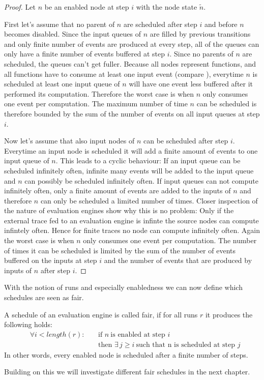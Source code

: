 \begin{proof}
  Let \(n\) be an enabled node at step \(i\) with the node state \(\widetilde{n}\).

  First let's assume that no parent of \(n\) are scheduled after step \(i\) and before \(n\) becomes disabled.
  Since the input queues of \(n\) are filled by previous transitions and only finite number of events are produced at every step, all of the queues can only have a finite number of events buffered at step \(i\).
  Since no parents of \(n\) are scheduled, the queues can't get fuller.
  Because all nodes represent functions, and all functions have to consume at least one input event (compare ), everytime \(n\) is scheduled at least one input queue of \(n\) will have one event less buffered after it performed its computation.
  Therefore the worst case is when \(n\) only consumes one event per computation.
  The maximum number of time \(n\) can be scheduled is therefore bounded by the sum of the number of events on all input queues at step \(i\).

  Now let's assume that also input nodes of \(n\) can be scheduled after step \(i\).
  Everytime an input node is scheduled it will add a finite amount of events to one input queue of \(n\).
  This leads to a cyclic behaviour: If an input queue can be scheduled infinitely often, infinite many events will be added to the input queue and \(n\) can possibly be scheduled infinitely often.
  If input queues can not compute infinitely often, only a finite amount of events are added to the inputs of \(n\) and therefore \(n\) can only be scheduled a limited number of times.
  Closer inspection of the nature of evaluation engines show why this is no problem: Only if the external trace fed to an evaluation engine is infinte the source nodes can compute infintely often.
  Hence for finite traces no node can compute infinitely often.
  Again the worst case is when \(n\) only consumes one event per computation.
  The number of times it can be scheduled is limited by the sum of the number of events buffered on the inputs at step \(i\) and the number of events that are produced by inputs of \(n\) after step \(i\).
\end{proof}

With the notion of runs and especially enabledness we can now define which schedules are seen as fair.

\begin{definition}[name = Fair Schedules]\label{def:fair_schedule}
  A schedule of an evaluation engine is called fair, if for all runs \(r\)  it produces the following holds:
  \begin{align*}
    &\forall i < \mathit{length}(r):\ &&\text{if }n\ \text{is enabled at step } i\\
    &                                 &&\text{then } \exists\, j \geq i\ \text{such that n is scheduled at step } j
\end{align*}
In other words, every enabled node is scheduled after a finite number of steps.
\end{definition}

Building on this we will investigate different fair schedules in the next chapter.

